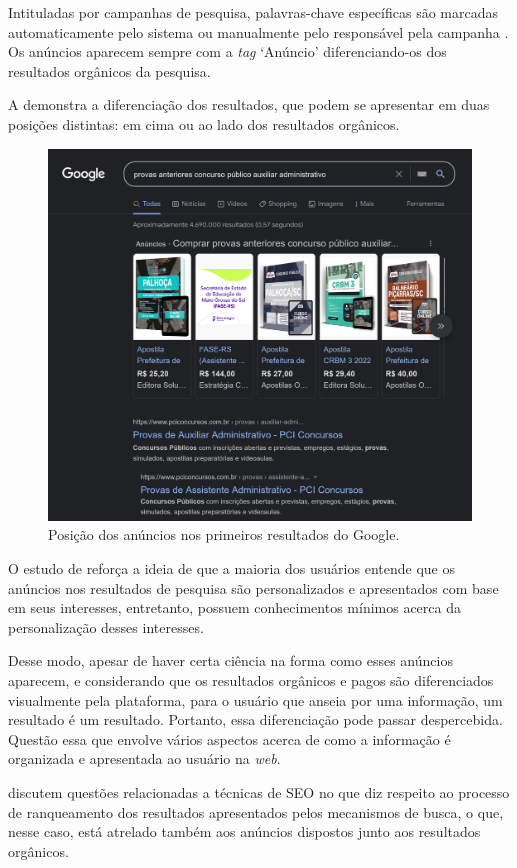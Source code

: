 \documentclass[portuguese]{textolivre}
\begin{document}
Intituladas por campanhas de pesquisa, palavras-chave específicas são marcadas automaticamente pelo sistema ou manualmente pelo responsável pela campanha \cite{google_escolher_2018}. Os anúncios aparecem sempre com a \textit{tag} ‘Anúncio’ diferenciando-os dos resultados orgânicos da pesquisa.

A  demonstra a diferenciação dos resultados, que podem se apresentar em duas posições distintas: em cima ou ao lado dos resultados orgânicos.

\begin{figure}[h!]
    \centering
    \includegraphics[width=0.8\linewidth]{fig-002.png}
    \caption{Posição dos anúncios nos primeiros resultados do Google.}
    \label{fig2}
\end{figure}

O estudo de \textcite{rosa_publicidade_2022} reforça a ideia de que a maioria dos usuários entende que os anúncios nos resultados de pesquisa são personalizados e apresentados com base em seus interesses, entretanto, possuem conhecimentos mínimos acerca da personalização desses interesses.

Desse modo, apesar de haver certa ciência na forma como esses anúncios aparecem, e considerando que os resultados orgânicos e pagos são diferenciados visualmente pela plataforma, para o usuário que anseia por uma informação, um resultado é um resultado. Portanto, essa diferenciação pode passar despercebida. Questão essa que envolve vários aspectos acerca de como a informação é organizada e apresentada ao usuário na \textit{web}.

\textcite{camossi_conceito_2023} discutem questões relacionadas a técnicas de SEO no que diz respeito ao processo de ranqueamento dos resultados apresentados pelos mecanismos de busca, o que, nesse caso, está atrelado também aos anúncios dispostos junto aos resultados orgânicos.
\end{document}
